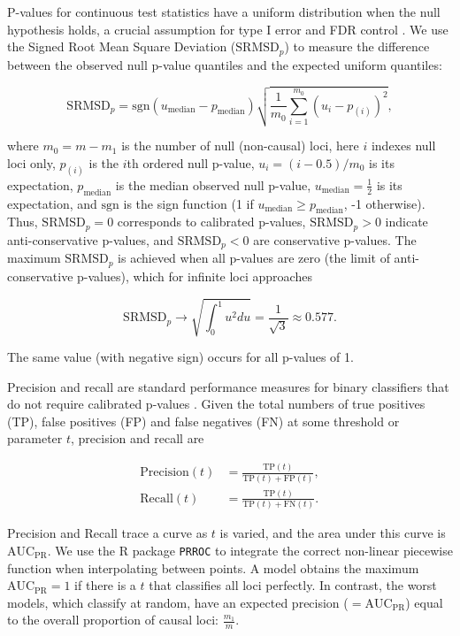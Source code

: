 \documentclass[11pt]{article}
\newcommand{\rmsd}{\text{SRMSD}_p}
\newcommand{\auc}{\text{AUC}_\text{PR}}
\begin{document}
\begin{linenumbers}
P-values for continuous test statistics have a uniform distribution when the null hypothesis holds, a crucial assumption for type I error and FDR control \citep{storey_positive_2003, storey_statistical_2003}.
We use the Signed Root Mean Square Deviation ($\rmsd$) to measure the difference between the observed null p-value quantiles and the expected uniform quantiles:
\begin{linenomath*}
$$
\rmsd
=
\text{sgn}(u_\text{median} - p_\text{median} ) \sqrt{ \frac{1}{m_0} \sum_{i = 1}^{m_0} \left( u_i - p_{(i)} \right)^2 },
$$
\end{linenomath*}
where
$m_0 = m - m_1$ is the number of null (non-causal) loci,
here $i$ indexes null loci only,
$p_{(i)}$ is the $i$th ordered null p-value,
$u_i = ( i - 0.5 ) / m_0$ is its expectation,
$p_\text{median}$ is the median observed null p-value,
$u_\text{median} = \frac{1}{2}$ is its expectation,
and $\text{sgn}$ is the sign function (1 if $u_\text{median} \ge p_\text{median}$, -1 otherwise).
Thus, $\rmsd = 0$ corresponds to calibrated p-values, $\rmsd > 0$ indicate anti-conservative p-values, and $\rmsd < 0$ are conservative p-values.
The maximum $\rmsd$ is achieved when all p-values are zero (the limit of anti-conservative p-values), which for infinite loci approaches
\begin{linenomath*}
$$
\rmsd
\rightarrow
\sqrt{ \int_0^1 u^2 du }
=
\frac{1}{ \sqrt{ 3 } }
\approx
0.577
.
$$
\end{linenomath*}
The same value (with negative sign) occurs for all p-values of 1.

Precision and recall are standard performance measures for binary classifiers that do not require calibrated p-values \citep{grau_prroc:_2015}.
Given the total numbers of true positives (TP), false positives (FP) and false negatives (FN) at some threshold or parameter $t$, precision and recall are
\begin{linenomath*}
\begin{align*}
  \text{Precision}(t)
  &=
    \frac{ \text{TP}(t) }{ \text{TP}(t) + \text{FP}(t) }
    , \\
  \text{Recall}(t)
  &=
    \frac{ \text{TP}(t) }{ \text{TP}(t) + \text{FN}(t) }
    .
\end{align*}
\end{linenomath*}
Precision and Recall trace a curve as $t$ is varied, and the area under this curve is $\auc$.
We use the R package \texttt{PRROC} to integrate the correct non-linear piecewise function when interpolating between points.
A model obtains the maximum $\auc = 1$ if there is a $t$ that classifies all loci perfectly.
In contrast, the worst models, which classify at random, have an expected precision ($= \auc$) equal to the overall proportion of causal loci:
$\frac{m_1}{m}$.



\end{linenumbers}
\end{document}
